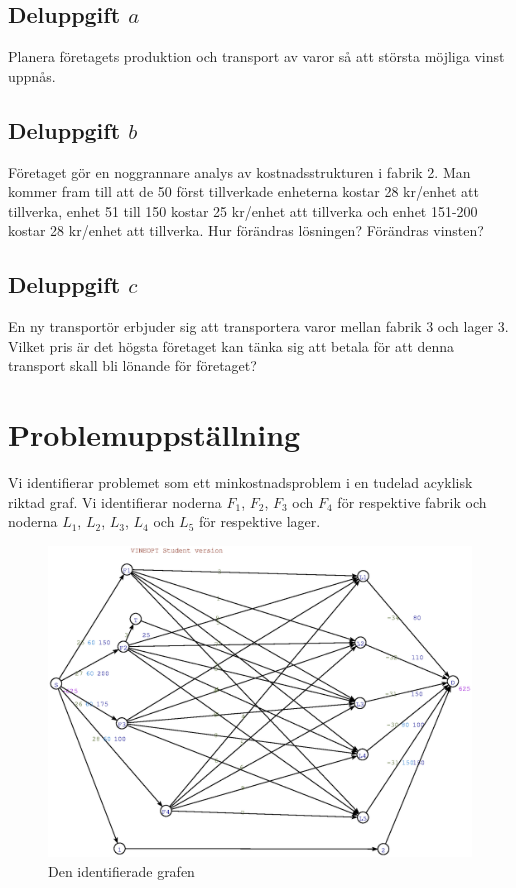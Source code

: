\documentclass[titlepage, a4paper]{article}
\begin{document}
\subsection{Deluppgift $a$}

Planera företagets produktion och transport av varor så att största möjliga vinst uppnås.

\subsection{Deluppgift $b$}

Företaget gör en noggrannare analys av kostnadsstrukturen i fabrik 2. Man kommer fram till att de 50 först tillverkade enheterna kostar 28 kr/enhet att tillverka, enhet 51 till 150 kostar 25 kr/enhet att tillverka och enhet 151-200 kostar 28 kr/enhet att tillverka. Hur förändras lösningen? Förändras vinsten?

\subsection{Deluppgift $c$}

En ny transportör erbjuder sig att transportera varor mellan fabrik 3 och lager 3. Vilket pris är det högsta företaget kan tänka sig att betala för att denna transport skall bli lönande för företaget?

\section{Problemuppställning}

Vi identifierar problemet som ett minkostnadsproblem i en tudelad acyklisk riktad graf. Vi identifierar noderna $F_{1}$, $F_{2}$, $F_{3}$ och $F_{4}$ för respektive fabrik och noderna $L_{1}$, $L_{2}$, $L_{3}$, $L_{4}$ och $L_{5}$ för respektive lager.

\begin{figure}[h!]
    \centerline{\includegraphics[scale=0.65]{laborationsuppgift_13a_original.ps}}
    \caption{Den identifierade grafen}
\end{figure}
\end{document}
